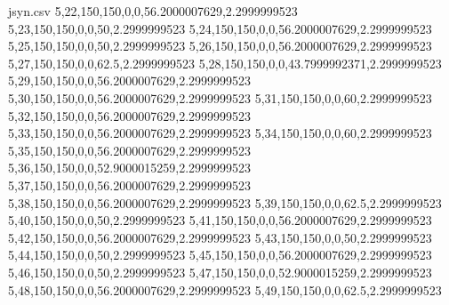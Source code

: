 \begin{filecontents*}{jsyn.csv}
5,22,150,150,0,0,56.2000007629,2.2999999523
5,23,150,150,0,0,50,2.2999999523
5,24,150,150,0,0,56.2000007629,2.2999999523
5,25,150,150,0,0,50,2.2999999523
5,26,150,150,0,0,56.2000007629,2.2999999523
5,27,150,150,0,0,62.5,2.2999999523
5,28,150,150,0,0,43.7999992371,2.2999999523
5,29,150,150,0,0,56.2000007629,2.2999999523
5,30,150,150,0,0,56.2000007629,2.2999999523
5,31,150,150,0,0,60,2.2999999523
5,32,150,150,0,0,56.2000007629,2.2999999523
5,33,150,150,0,0,56.2000007629,2.2999999523
5,34,150,150,0,0,60,2.2999999523
5,35,150,150,0,0,56.2000007629,2.2999999523
5,36,150,150,0,0,52.9000015259,2.2999999523
5,37,150,150,0,0,56.2000007629,2.2999999523
5,38,150,150,0,0,56.2000007629,2.2999999523
5,39,150,150,0,0,62.5,2.2999999523
5,40,150,150,0,0,50,2.2999999523
5,41,150,150,0,0,56.2000007629,2.2999999523
5,42,150,150,0,0,56.2000007629,2.2999999523
5,43,150,150,0,0,50,2.2999999523
5,44,150,150,0,0,50,2.2999999523
5,45,150,150,0,0,56.2000007629,2.2999999523
5,46,150,150,0,0,50,2.2999999523
5,47,150,150,0,0,52.9000015259,2.2999999523
5,48,150,150,0,0,56.2000007629,2.2999999523
5,49,150,150,0,0,62.5,2.2999999523
\end{filecontents*}